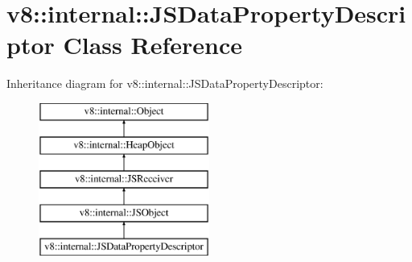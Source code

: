 \hypertarget{classv8_1_1internal_1_1_j_s_data_property_descriptor}{}\section{v8\+:\+:internal\+:\+:J\+S\+Data\+Property\+Descriptor Class Reference}
\label{classv8_1_1internal_1_1_j_s_data_property_descriptor}
Inheritance diagram for v8\+:\+:internal\+:\+:J\+S\+Data\+Property\+Descriptor\+:\begin{figure}[H]
\begin{center}
\leavevmode
\includegraphics[height=5.000000cm]{classv8_1_1internal_1_1_j_s_data_property_descriptor}
\end{center}
\end{figure}
